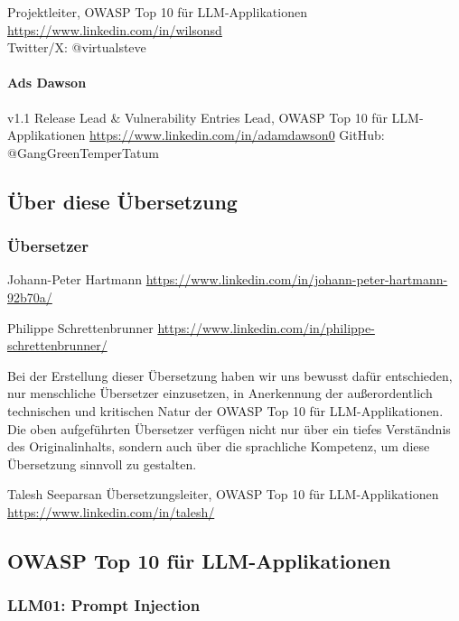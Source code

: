 \documentclass[
]{article}
\begin{document}
Projektleiter, OWASP Top 10 für LLM-Applikationen
\href{https://www.linkedin.com/in/wilsonsd/}{https://www.linkedin.com/in/wilsonsd}\\
Twitter/X: @virtualsteve

\paragraph{Ads Dawson}\label{ads-dawson}

v1.1 Release Lead \& Vulnerability Entries Lead, OWASP Top 10 für
LLM-Applikationen
\href{https://www.linkedin.com/in/adamdawson0/}{https://www.linkedin.com/in/adamdawson0}
GitHub: @GangGreenTemperTatum

\subsection{Über diese Übersetzung}\label{uxfcber-diese-uxfcbersetzung}

\subsubsection{Übersetzer}\label{uxfcbersetzer}

Johann-Peter Hartmann
\url{https://www.linkedin.com/in/johann-peter-hartmann-92b70a/}

Philippe Schrettenbrunner
\url{https://www.linkedin.com/in/philippe-schrettenbrunner/}

Bei der Erstellung dieser Übersetzung haben wir uns bewusst dafür
entschieden, nur menschliche Übersetzer einzusetzen, in Anerkennung der
außerordentlich technischen und kritischen Natur der OWASP Top 10 für
LLM-Applikationen. Die oben aufgeführten Übersetzer verfügen nicht nur
über ein tiefes Verständnis des Originalinhalts, sondern auch über die
sprachliche Kompetenz, um diese Übersetzung sinnvoll zu gestalten.

Talesh Seeparsan Übersetzungsleiter, OWASP Top 10 für LLM-Applikationen
\url{https://www.linkedin.com/in/talesh/}

\subsection{OWASP Top 10 für
LLM-Applikationen}\label{owasp-top-10-fuxfcr-llm-applikationen}

\subsubsection{LLM01: Prompt Injection}\label{llm01-prompt-injection}
\end{document}
